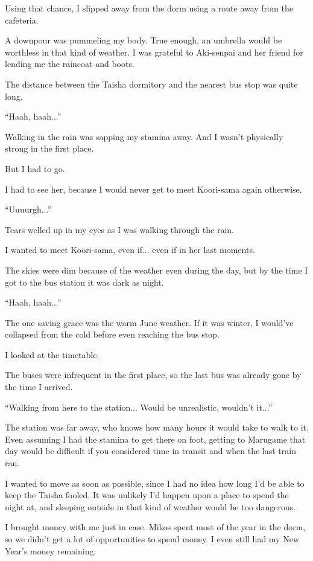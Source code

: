 Using that chance, I slipped away from the dorm using a route away from the cafeteria.

A downpour was pummeling my body. True enough, an umbrella would be worthless in that kind of weather. I was grateful to Aki-senpai and her friend for lending me the raincoat and boots.

The distance between the Taisha dormitory and the nearest bus stop was quite long.

``Haah, haah...''

Walking in the rain was sapping my stamina away. And I wasn't physically strong in the first place.

But I had to go.

I had to see her, because I would never get to meet Koori-sama again otherwise.

``Uuuurgh...''

Tears welled up in my eyes as I was walking through the rain.

I wanted to meet Koori-sama, even if... even if in her last moments.

The skies were dim because of the weather even during the day, but by the time I got to the bus station it was dark as night.

``Haah, haah...''

The one saving grace was the warm June weather. If it was winter, I would've collapsed from the cold before even reaching the bus stop.

I looked at the timetable.

The buses were infrequent in the first place, so the last bus was already gone by the time I arrived.

``Walking from here to the station... Would be unrealistic, wouldn't it...''

The station was far away, who knows how many hours it would take to walk to it. Even assuming I had the stamina to get there on foot, getting to Marugame that day would be difficult if you considered time in transit and when the last train ran.

I wanted to move as soon as possible, since I had no idea how long I'd be able to keep the Taisha fooled. It was unlikely I'd happen upon a place to spend the night at, and sleeping outside in that kind of weather would be too dangerous.

I brought money with me just in case. Mikos spent most of the year in the dorm, so we didn't get a lot of opportunities to spend money. I even still had my New Year's money remaining.

